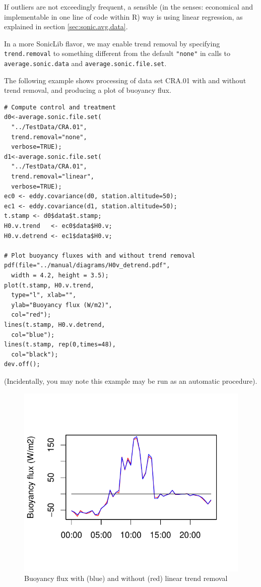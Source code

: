 \documentclass[a4paper,10pt]{book}
\begin{document}
If outliers are not exceedingly frequent, a sensible (in the senses: economical and implementable in one line of code within R) way is using linear regression, as explained in section \ref{sec:sonic.avg.data}.

In a more SonicLib flavor, we may enable trend removal by specifying \verb|trend.removal| to something different from the default \verb|"none"| in calls to \verb|average.sonic.data| and \verb|average.sonic.file.set|.

The following example shows processing of data set CRA.01 with and without trend removal, and producing a plot of buoyancy flux.

\begin{verbatim}
# Compute control and treatment
d0<-average.sonic.file.set(
  "../TestData/CRA.01",
  trend.removal="none",
  verbose=TRUE);
d1<-average.sonic.file.set(
  "../TestData/CRA.01",
  trend.removal="linear",
  verbose=TRUE);
ec0 <- eddy.covariance(d0, station.altitude=50);
ec1 <- eddy.covariance(d1, station.altitude=50);
t.stamp <- d0$data$t.stamp;
H0.v.trend   <- ec0$data$H0.v;
H0.v.detrend <- ec1$data$H0.v;

# Plot buoyancy fluxes with and without trend removal
pdf(file="../manual/diagrams/H0v_detrend.pdf",
  width = 4.2, height = 3.5);
plot(t.stamp, H0.v.trend,
  type="l", xlab="",
  ylab="Buoyancy flux (W/m2)",
  col="red");
lines(t.stamp, H0.v.detrend,
  col="blue");
lines(t.stamp, rep(0,times=48),
  col="black");
dev.off();
\end{verbatim}

(Incidentally, you may note this example may be run as an automatic procedure).

\begin{figure}[htp]
 \centering
 \begin{center}
 \includegraphics[scale=1.1,keepaspectratio=true]{./diagrams/H0vDetrend.pdf}
 \end{center}
 \caption{Buoyancy flux with (blue) and without (red) linear trend removal}
 \label{fig:H0v detrend}
\end{figure}
\end{document}
